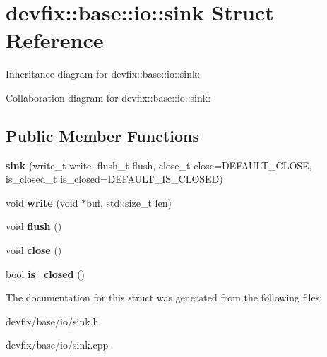 \hypertarget{structdevfix_1_1base_1_1io_1_1sink}{}\section{devfix\+:\+:base\+:\+:io\+:\+:sink Struct Reference}
\label{structdevfix_1_1base_1_1io_1_1sink}


Inheritance diagram for devfix\+:\+:base\+:\+:io\+:\+:sink\+:


Collaboration diagram for devfix\+:\+:base\+:\+:io\+:\+:sink\+:
\subsection*{Public Member Functions}
\begin{DoxyCompactItemize}
\item 
\mbox{\label{structdevfix_1_1base_1_1io_1_1sink_a5e065482904521fde4ac8d0e378529c8}} 
{\bfseries sink} (write\+\_\+t write, flush\+\_\+t flush, close\+\_\+t close=D\+E\+F\+A\+U\+L\+T\+\_\+\+C\+L\+O\+SE, is\+\_\+closed\+\_\+t is\+\_\+closed=D\+E\+F\+A\+U\+L\+T\+\_\+\+I\+S\+\_\+\+C\+L\+O\+S\+ED)
\item 
\mbox{\label{structdevfix_1_1base_1_1io_1_1sink_a912eebd869f230d506a2c8fcd69051b4}} 
void {\bfseries write} (void $\ast$buf, std\+::size\+\_\+t len)
\item 
\mbox{\label{structdevfix_1_1base_1_1io_1_1sink_abf208747c9be8295972fbc4696ddc557}} 
void {\bfseries flush} ()
\item 
\mbox{\label{structdevfix_1_1base_1_1io_1_1sink_a2d110d27baa88f462540e7fd59fb8b3c}} 
void {\bfseries close} ()
\item 
\mbox{\label{structdevfix_1_1base_1_1io_1_1sink_a1e5782219f9256d8ff09385fa6f3b156}} 
bool {\bfseries is\+\_\+closed} ()
\end{DoxyCompactItemize}


The documentation for this struct was generated from the following files\+:\begin{DoxyCompactItemize}
\item 
devfix/base/io/sink.\+h\item 
devfix/base/io/sink.\+cpp\end{DoxyCompactItemize}
